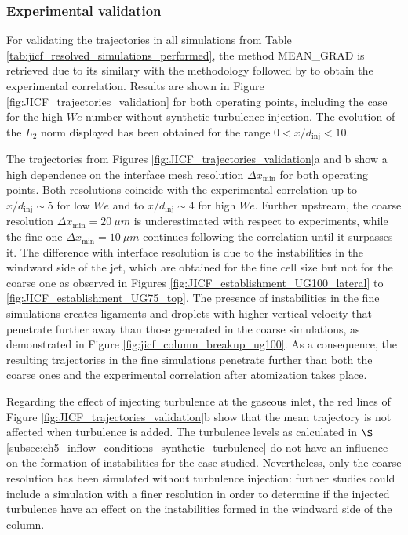 \subsubsection*{Experimental validation}

For validating the trajectories in all simulations from Table \ref{tab:jicf_resolved_simulations_performed}, the method MEAN\_GRAD is retrieved due to its similary with the methodology followed by  to obtain the experimental correlation. Results are shown in Figure \ref{fig:JICF_trajectories_validation} for both operating points, including the case for the high $We$ number without synthetic turbulence injection. The evolution of the $L_2$ norm displayed has been obtained for the range $0 < x/d_\mathrm{inj} < 10$.

The trajectories from Figures \ref{fig:JICF_trajectories_validation}a and b show a high dependence on the interface mesh resolution $\Delta x_\mathrm{min}$ for both operating points. Both resolutions coincide with the experimental correlation up to $x/d_\mathrm{inj} \sim 5$ for low $We$ and to $x/d_\mathrm{inj} \sim 4$ for high $We$. Further upstream, the coarse resolution $\Delta x_\mathrm{min} = 20~\mu m$ is underestimated with respect to experiments, while the fine one $\Delta x_\mathrm{min} = 10~\mu m$ continues following the correlation until it surpasses it. The difference with interface resolution is due to the instabilities in the windward side of the jet, which are obtained for the fine cell size but not for the coarse one as observed in Figures \ref{fig:JICF_establishment_UG100_lateral} to \ref{fig:JICF_establishment_UG75_top}. The presence of instabilities in the fine simulations creates ligaments and droplets with higher vertical velocity that penetrate further away than those generated in the coarse simulations, as demonstrated in Figure \ref{fig:jicf_column_breakup_ug100}. As a consequence, the resulting trajectories in the fine simulations penetrate further than both the coarse ones and the experimental correlation after atomization takes place. 


Regarding the effect of injecting turbulence at the gaseous inlet, the red lines of Figure \ref{fig:JICF_trajectories_validation}b show that the mean trajectory is not affected when turbulence is added. The turbulence levels as calculated in $\S$\ref{subsec:ch5_inflow_conditions_synthetic_turbulence} do not have an influence on the formation of instabilities for the case studied. Nevertheless, only the coarse resolution has been simulated without turbulence injection: further studies could include a simulation with a finer resolution in order to determine if the injected turbulence have an effect on the instabilities formed in the windward side of the column.

